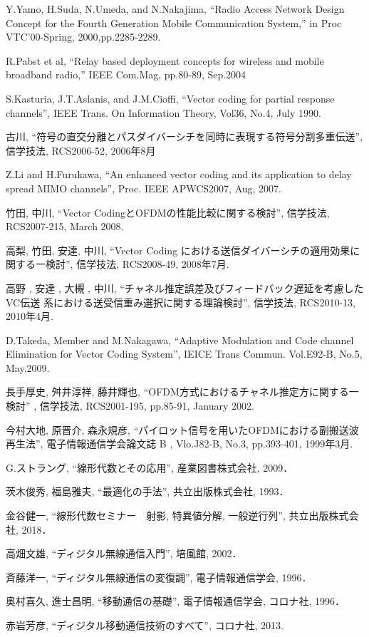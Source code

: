 \begin{thebibliography}{99}
     Y.Yamo, H.Suda, N.Umeda, and N.Nakajima,
    ``Radio Access Network Design Concept for the Fourth Generation Mobile
    Communication System,'' in Proc VTC'00-Spring, 2000,pp.2285-2289.

     R.Pabst et al, 
    “Relay based deployment concepts for wireless and mobile broadband radio,” IEEE
    Com.Mag, pp.80-89, Sep.2004

     S.Kasturia, J.T.Aslanis, and J.M.Cioffi, ``Vector coding for partial
    response channels'', IEEE Trans. On Information Theory, Vol36, No.4, July 1990.

     古川, ``符号の直交分離とパスダイバーシチを同時に表現する符号分割多重伝送'',
    信学技法, RCS2006-52, 2006年8月

     Z.Li and H.Furukawa, ``An enhanced vector coding and its application to delay
    spread MIMO channels'', Proc. IEEE APWCS2007, Aug, 2007.

     竹田, 中川, ``Vector CodingとOFDMの性能比較に関する検討'', 信学技法,
    RCS2007-215, March 2008.

     高梨, 竹田, 安達, 中川, ``Vector Coding における送信ダイバーシチの適用効果に
    関する一検討'', 信学技法, RCS2008-49, 2008年7月.

     高野 , 安達 , 大槻 , 中川, ``チャネル推定誤差及びフィードバック遅延を考慮したVC伝送
    系における送受信重み選択に関する理論検討'', 信学技法, RCS2010-13, 2010年4月.

     D.Takeda, Member and M.Nakagawa, ``Adaptive Modulation and Code channel
    Elimination for Vector Coding System'', IEICE Trans Commun. Vol.E92-B, No.5, May.2009.

     長手厚史, 舛井淳祥, 藤井輝也, ``OFDM方式におけるチャネル推定方に関する一検討''
    , 信学技法, RCS2001-195, pp.85-91, January 2002.

     今村大地, 原晋介, 森永規彦, ``パイロット信号を用いたOFDMにおける副搬送波再生法'',
     電子情報通信学会論文誌 B , Vlo.J82-B, No.3, pp.393-401, 1999年3月.

     G.ストラング, ``線形代数とその応用'', 産業図書株式会社, 2009．

     茨木俊秀, 福島雅夫, ``最適化の手法'', 共立出版株式会社, 1993．

     金谷健一, ``線形代数セミナー　射影, 特異値分解, 一般逆行列'', 共立出版株式会社, 2018．

     高畑文雄, ``ディジタル無線通信入門'', 培風館, 2002．

     斉藤洋一, ``ディジタル無線通信の変復調'', 電子情報通信学会, 1996．

     奥村喜久, 進士昌明, ``移動通信の基礎'', 電子情報通信学会, コロナ社, 1996．

     赤岩芳彦, ``ディジタル移動通信技術のすべて'', コロナ社, 2013.
\end{thebibliography}
